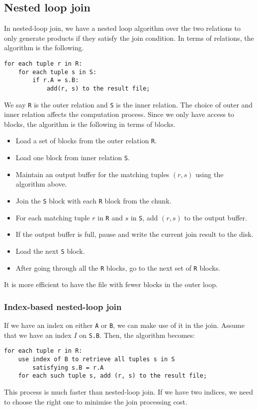 \documentclass[a4paper, openany]{memoir}
\theoremstyle{definition}
\theoremstyle{plain}
\begin{document}
\subsection{Nested loop join}
In nested-loop join, we have a nested loop algorithm over the two relations to only generate products if they satisfy the join condition. In terms of relations, the algorithm is the following.
\begin{verbatim}
for each tuple r in R:
    for each tuple s in S:
        if r.A = s.B:
            add(r, s) to the result file;
\end{verbatim}
We say \texttt{R} is the outer relation and \texttt{S} is the inner relation. The choice of outer and inner relation affects the computation process. Since we only have access to blocks, the algorithm is the following in terms of blocks.
\begin{itemize}
    \item Load a set of blocks from the outer relation \texttt{R}.
    \item Load one block from inner relation \texttt{S}.
    \item Maintain an output buffer for the matching tuples $(r, s)$ using the algorithm above.
    \item Join the \texttt{S} block with each \texttt{R} block from the chunk.
    \item For each matching tuple $r$ in \texttt{R} and $s$ in \texttt{S}, add $(r, s)$ to the output buffer.
    \item If the output buffer is full, pause and write the current join result to the disk.
    \item Load the next \texttt{S} block.
    \item After going through all the \texttt{R} blocks, go to the next set of \texttt{R} blocks.
\end{itemize}
It is more efficient to have the file with fewer blocks in the outer loop.

\subsubsection{Index-based nested-loop join}
If we have an index on either \texttt{A} or \texttt{B}, we can make use of it in the join. Assume that we have an index $I$ on \texttt{S.B}. Then, the algorithm becomes:
\begin{verbatim}
for each tuple r in R:
    use index of B to retrieve all tuples s in S 
        satisfying s.B = r.A
    for each such tuple s, add (r, s) to the result file;
\end{verbatim} 
This process is much faster than nested-loop join. If we have two indices, we need to choose the right one to minimise the join processing cost.
\end{document}
